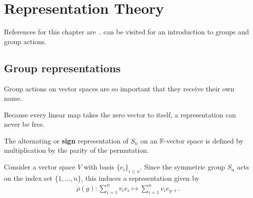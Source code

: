 \chapter{Representation Theory}

    References for this chapter are~\citet{jeevanjee_introduction_2015,
    fulton_representation_2004}.  can be visited for an introduction to groups and group actions.

    \minitoc

\section{Group representations}

    Group actions on vector spaces are so important that they receive their own name.
    \begin{property}[Freeness]
        Because every linear map takes the zero vector to itself, a representation can never be free.
    \end{property}


    \begin{example}\label{rep:sign_representation}
        The alternating or \textbf{sign} representation of $S_n$ on an $\mathbb{R}$-vector space is defined by multiplication by the parity of the permutation.
    \end{example}

    \begin{example}\label{rep:permutation}
        Consider a vector space $V$ with basis $\{e_i\}_{i\leq n}$. Since the symmetric group $S_n$ acts on the index set $\{1,\ldots,n\}$, this induces a representation given by
        \begin{gather}
            \rho(g):\sum_{i=1}^nv_ie_i\mapsto\sum_{i=1}^nv_ie_{g\cdot i}\,.
        \end{gather}
    \end{example}

